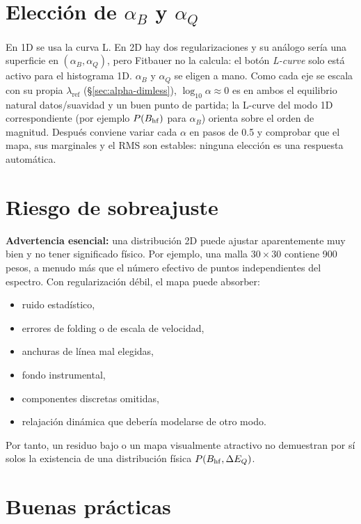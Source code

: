 \section{Elección de \texorpdfstring{$\alpha_B$ y $\alpha_Q$}{alpha B y alpha Q}}

En 1D se usa la curva L. En 2D hay dos regularizaciones y su análogo sería una
superficie en $(\alpha_B,\alpha_Q)$, pero Fitbauer no la calcula: el botón
\emph{L-curve} solo está activo para el histograma 1D. $\alpha_B$ y $\alpha_Q$ se
eligen a mano. Como cada eje se escala con su propia $\lambda_{\text{ref}}$
(\S\ref{sec:alpha-dimless}), $\log_{10}\alpha\approx0$ es en ambos el equilibrio
natural datos/suavidad y un buen punto de partida; la L-curve del modo 1D
correspondiente (por ejemplo $P(B_{\mathrm{hf}})$ para $\alpha_B$) orienta sobre el orden
de magnitud. Después conviene variar cada $\alpha$ en pasos de 0.5 y comprobar
que el mapa, sus marginales y el RMS son estables: ninguna elección es una
respuesta automática.

\section{Riesgo de sobreajuste}

\textbf{Advertencia esencial:} una distribución 2D puede ajustar aparentemente
muy bien y no tener significado físico. Por ejemplo, una malla $30\times30$
contiene 900 pesos, a menudo más que el número efectivo de puntos independientes
del espectro. Con regularización débil, el mapa puede absorber:
\begin{itemize}
  \item ruido estadístico,
  \item errores de folding o de escala de velocidad,
  \item anchuras de línea mal elegidas,
  \item fondo instrumental,
  \item componentes discretas omitidas,
  \item relajación dinámica que debería modelarse de otro modo.
\end{itemize}
Por tanto, un residuo bajo o un mapa visualmente atractivo no demuestran por sí
solos la existencia de una distribución física $P(B_{\mathrm{hf}},\Delta E_Q)$.

\section{Buenas prácticas}

